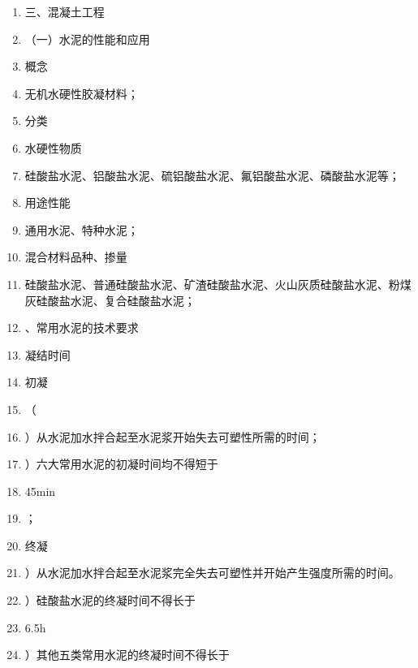 \documentclass[UTF8,fontset=fandol,11pt]{ctexart}
\begin{document}
\begin{enumerate}[label=\arabic*.]

\item 三、混凝土工程

\item （一）水泥的性能和应用

\item 概念

\item 无机水硬性胶凝材料；

\item 分类

\item 水硬性物质

\item 硅酸盐水泥、铝酸盐水泥、硫铝酸盐水泥、氟铝酸盐水泥、磷酸盐水泥等；

\item 用途性能

\item 通用水泥、特种水泥；

\item 混合材料品种、掺量

\item 硅酸盐水泥、普通硅酸盐水泥、矿渣硅酸盐水泥、火山灰质硅酸盐水泥、粉煤灰硅酸盐水泥、复合硅酸盐水泥；

\item 、常用水泥的技术要求

\item 凝结时间

\item 初凝

\item （

\item ）从水泥加水拌合起至水泥浆开始失去可塑性所需的时间；

\item ）六大常用水泥的初凝时间均不得短于

\item 45min

\item ；

\item 终凝

\item ）从水泥加水拌合起至水泥浆完全失去可塑性并开始产生强度所需的时间。

\item ）硅酸盐水泥的终凝时间不得长于

\item 6.5h

\item ）其他五类常用水泥的终凝时间不得长于

\end{enumerate}
\end{document}
